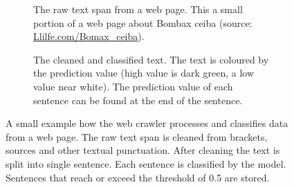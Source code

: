 \documentclass[a4paper, 12pt, oneside]{book} %
\begin{document}
\begin{figure} [t]
     \centering
     \begin{subfigure}[b]{1.00\textwidth}
         \centering
         \caption[Raw text span example]{The raw text span from a web page. This a small portion of a web page about Bombax ceiba (source: \href{http://www.llifle.com/Encyclopedia/TREES/Family/Bombacaceae/31994/Bombax_ceiba}{Llilfe.com/Bomax\_ceiba}).}
         \label{fig:webcrawler_sents_nopred}
     \end{subfigure}
     \vfill
     \begin{subfigure}[b]{1.00\textwidth}
         \centering
         \caption[Cleaned and classified text span example]{The cleaned and classified text. The text is coloured by the prediction value (high value is dark green, a low value near white). The prediction value of each sentence can be found at the end of the sentence.}
         \label{fig:webcrawler_sents_pred}
     \end{subfigure}
     \caption[Example of the web crawler process]{A small example how the web crawler processes and classifies data from a web page. The raw text span is cleaned from brackets, sources and other textual punctuation. After cleaning the text is split into single sentence. Each sentence is classified by the model. Sentences that reach or exceed the threshold of 0.5 are stored.}
\end{figure}
\end{document}

